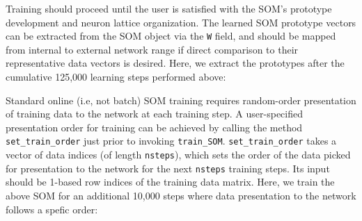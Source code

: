 \documentclass[]{article}
\newenvironment{Shaded}{\begin{snugshade}}{\end{snugshade}}
\newcommand{\CommentTok}[1]{\textcolor[rgb]{0.56,0.35,0.01}{\textit{#1}}}
\newcommand{\DecValTok}[1]{\textcolor[rgb]{0.00,0.00,0.81}{#1}}
\newcommand{\KeywordTok}[1]{\textcolor[rgb]{0.13,0.29,0.53}{\textbf{#1}}}
\newcommand{\NormalTok}[1]{#1}
\newcommand{\OperatorTok}[1]{\textcolor[rgb]{0.81,0.36,0.00}{\textbf{#1}}}
\newcommand{\StringTok}[1]{\textcolor[rgb]{0.31,0.60,0.02}{#1}}
\begin{document}
Training should proceed until the user is satisfied with the SOM's prototype development and neuron lattice organization. The learned SOM prototype vectors can be extracted from the SOM object via the \texttt{W} field, and should be mapped from internal to external network range if direct comparison to their representative data vectors is desired. Here, we extract the prototypes after the cumulative 125,000 learning steps performed above:

\begin{Shaded}
\end{Shaded}

Standard online (i.e, not batch) SOM training requires random-order presentation of training data to the network at each training step. A user-specified presentation order for training can be achieved by calling the method \texttt{set\_train\_order} just prior to invoking \texttt{train\_SOM}. \texttt{set\_train\_order} takes a vector of data indices (of length \texttt{nsteps}), which sets the order of the data picked for presentation to the network for the next \texttt{nsteps} training steps. Its input should be 1-based row indices of the training data matrix. Here, we train the above SOM for an additional 10,000 steps where data presentation to the network follows a spefic order:

\begin{Shaded}
\end{Shaded}
\end{document}

